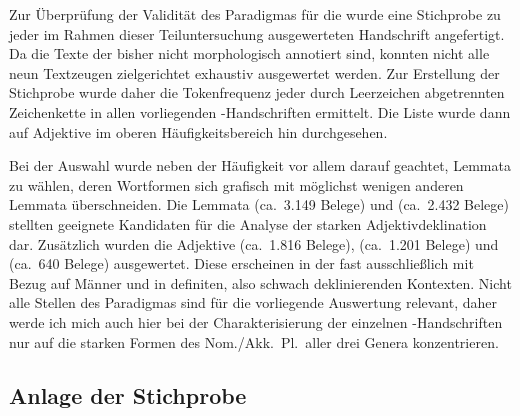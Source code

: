 

Zur Überprüfung der Validität des Paradigmas für die \KC{} wurde eine
Stichprobe zu jeder im Rahmen dieser Teiluntersuchung ausgewerteten Handschrift
angefertigt. Da die Texte der \KC{} bisher nicht morphologisch
annotiert sind, konnten nicht alle neun Textzeugen zielgerichtet exhaustiv
ausgewertet werden. Zur Erstellung der Stichprobe wurde daher die Tokenfrequenz
jeder durch Leerzeichen abgetrennten Zeichenkette in allen vorliegenden
\KC{}-Handschriften ermittelt. Die Liste wurde dann auf Adjektive im
oberen Häufigkeitsbereich hin durchgesehen.

Bei der Auswahl wurde neben der Häufigkeit vor allem darauf geachtet, Lemmata
zu wählen, deren Wortformen sich grafisch mit möglichst wenigen anderen
Lemmata überschneiden. Die Lemmata
 (ca.~3.149 Belege) und
  (ca.~2.432 Belege) stellten geeignete Kandidaten für
die Analyse der starken Adjektivdeklination dar. Zusätzlich wurden die
Adjektive
  (ca.~1.816 Belege),  
(ca.~1.201 Belege) und   (ca.~640 Belege) ausgewertet.
Diese erscheinen in der \KC{} fast ausschließlich mit Bezug auf Männer und
in definiten, also schwach deklinierenden Kontexten. Nicht alle Stellen des
Paradigmas sind für die vorliegende Auswertung relevant, daher werde ich mich
auch hier bei der Charakterisierung der einzelnen \KC{}-Handschriften nur
auf die starken Formen des Nom./Akk.\ Pl.\ aller drei Genera konzentrieren.

\subsection{Anlage der Stichprobe}

